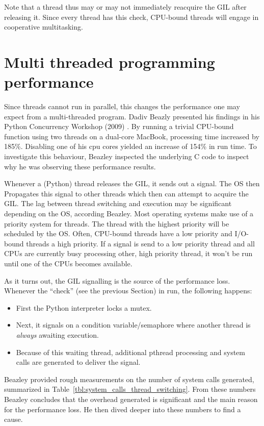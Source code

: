 Note that a thread thus may or may not immediately reacquire the GIL after releasing it.
Since every thread has this check, CPU-bound threads will engage in cooperative multitasking.

\section{Multi threaded programming performance}
\label{sct:multi_theaded_programming_performance}

Since threads cannot run in parallel, this changes the performance one may expect from a multi-threaded program.
Dadiv Beazly presented his findings in his Python Concurrency Workshop (2009) \cite{beazley2009inside}.
By running a trivial CPU-bound function using two threads on a dual-core MacBook, processing time increased by 185\%.
Disabling one of his cpu cores yielded an increase of 154\% in run time.
To investigate this behaviour, Beazley inspected the underlying C code to inspect why he was observing these performance results.

Whenever a (Python) thread releases the GIL, it sends out a signal.
The OS then Propagates this signal to other threads which then can attempt to acquire the GIL.
The lag between thread switching and execution may be significant depending on the OS, according Beazley.
Most operating systems make use of a priority system for threads. 
The thread with the highest priority will be scheduled by the OS.
Often, CPU-bound threads have a low priority and I/O-bound threads a high priority.
If a signal is send to a low priority thread and all CPUs are currently busy processing other, high priority thread, it won't be run until one of the CPUs becomes available.

As it turns out, the GIL signalling is the source of the performance loss.
Whenever the ``check'' (see the previous Section) in run, the following happens:

\begin{itemize}
	\item First the Python interpreter locks a mutex.
	\item Next, it signals on a condition variable/semaphore where another thread is \emph{always} awaiting execution.
	\item Because of this waiting thread, additional pthread processing and system calls are generated to deliver the signal.
\end{itemize}

Beazley provided rough measurements on the number of system calls generated, summarized in Table~\ref{tbl:system_calls_thread_switching}.
From these numbers Beazley concludes that the overhead generated is significant and the main reason for the performance loss.
He then dived deeper into these numbers to find a cause.

